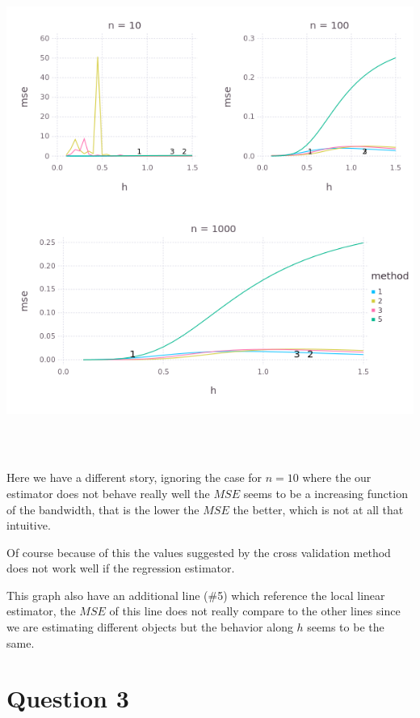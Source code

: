 \documentclass{article}
\begin{document}
\begin{center}
\includegraphics[width=16cm, height=16cm]{Q2-b.png}
\end{center}

Here we have a different story, ignoring the case for $n = 10$ where the our estimator
does not behave really well the $MSE$ seems to be a increasing function of the bandwidth,
that is the lower the $MSE$ the better, which is not at all that intuitive.

Of course because of this the values suggested by the cross validation method does not
work well if the regression estimator.

This graph also have an additional line (\#5) which reference the local linear estimator,
the $MSE$ of this line does not really compare to the other lines since we are estimating
different objects but the behavior along $h$ seems to be the same.



\section{Question 3}
\end{document}
